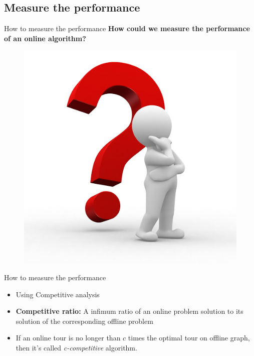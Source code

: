 \documentclass{beamer}
\begin{document}
\subsection{Measure the performance}
\begin{frame}{How to measure the performance}
    \centering \textbf{How could we measure the performance of an online algorithm?}
    \begin{figure}[b]
        \centering
        \includegraphics[scale=0.15]{unnamed.jpg}
        \label{fig:my_label}
    \end{figure}
\end{frame}
\begin{frame}{How to measure the performance}
    \begin{itemize}
        \item Using Competitive analysis \pause
        \item \textbf{Competitive ratio:} A infimum ratio of an online problem solution to its solution of the corresponding offline problem \pause
        \item If an online tour is no longer than $c$ times the optimal tour on offline graph, then it's called \emph{c-competitive} algorithm.
    \end{itemize}
\end{frame}
% 
\end{document}
